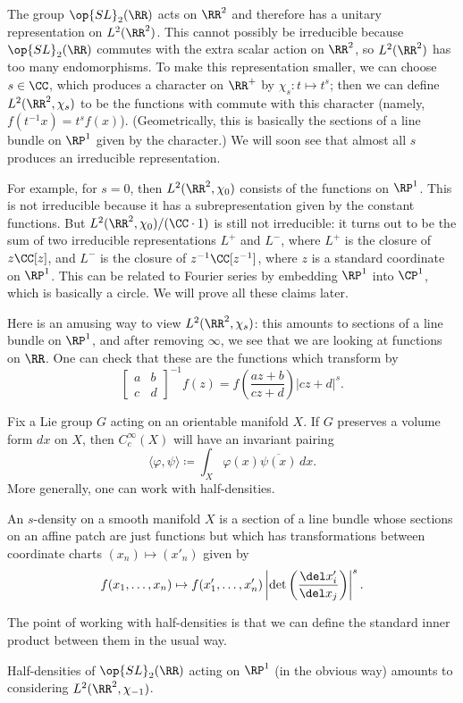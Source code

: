 \documentclass[../notes.tex]{subfiles}
\begin{document}
\begin{example} \label{ex:sl2-standard}
	The group $\op{SL}_2(\RR)$ acts on $\RR^2$ and therefore has a unitary representation on $L^2(\RR^2)$. This cannot possibly be irreducible because $\op{SL}_2(\RR)$ commutes with the extra scalar action on $\RR^2$, so $L^2(\RR^2)$ has too many endomorphisms. To make this representation smaller, we can choose $s\in\CC$, which produces a character on $\RR^+$ by $\chi_s\colon t\mapsto t^s$; then we can define $L^2(\RR^2,\chi_s)$ to be the functions with commute with this character (namely, $f(t^{-1}x)=t^sf(x)$). (Geometrically, this is basically the sections of a line bundle on $\RP^1$ given by the character.) We will soon see that almost all $s$ produces an irreducible representation.
	
	For example, for $s=0$, then $L^2(\RR^2,\chi_0)$ consists of the functions on $\RP^1$. This is not irreducible because it has a subrepresentation given by the constant functions. But $L^2(\RR^2,\chi_0)/(\CC\cdot1)$ is still not irreducible: it turns out to be the sum of two irreducible representations $L^+$ and $L^-$, where $L^+$ is the closure of $z\CC[z]$, and $L^-$ is the closure of $z^{-1}\CC[z^{-1}]$, where $z$ is a standard coordinate on $\RP^1$. This can be related to Fourier series by embedding $\RP^1$ into $\CP^1$, which is basically a circle. We will prove all these claims later.
\end{example}
\begin{remark}
	Here is an amusing way to view $L^2(\RR^2,\chi_s)$: this amounts to sections of a line bundle on $\RP^1$, and after removing $\infty$, we see that we are looking at functions on $\RR$. One can check that these are the functions which transform by
	\[\begin{bmatrix}
		a & b \\ c & d
	\end{bmatrix}^{-1}f(z)=f\left(\frac{az+b}{cz+d}\right)\left|cz+d\right|^s.\]
\end{remark}
Fix a Lie group $G$ acting on an orientable manifold $X$. If $G$ preserves a volume form $dx$ on $X$, then $C_c^\infty(X)$ will have an invariant pairing
\[\langle\varphi,\psi\rangle\coloneqq\int_X\varphi(x)\overline{\psi(x)}\,dx.\]
More generally, one can work with half-densities.
\begin{definition}[density]
	An $s$-density on a smooth manifold $X$ is a section of a line bundle whose sections on an affine patch are just functions but which has transformations between coordinate charts $(x_n)\mapsto (x'_n)$ given by
	\[f(x_1,\ldots,x_n)\mapsto f(x_1',\ldots,x_n')\left|\det\left(\frac{\del x'_i}{\del x_j}\right)\right|^s.\]
\end{definition}
The point of working with half-densities is that we can define the standard inner product between them in the usual way.
\begin{example}
	Half-densities of $\op{SL}_2(\RR)$ acting on $\RP^1$ (in the obvious way) amounts to considering $L^2(\RR^2,\chi_{-1})$.
\end{example}
\end{document}
